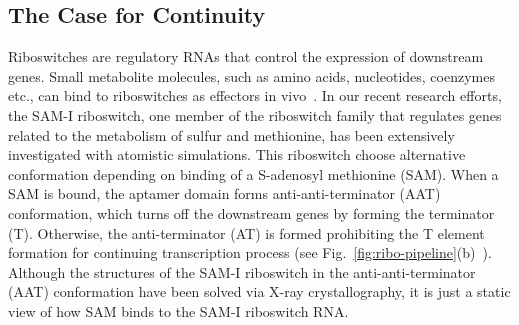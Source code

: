 \documentclass[a4paper,11pt]{article}
\newcommand{\yyenote}[1]{ {\textcolor{green} { ***YYE: #1 }}}
\newcommand{\yyenote}[1]{ {}}
\begin{document}


\subsection{The Case for Continuity}

Riboswitches are regulatory RNAs that control the expression of downstream genes. Small metabolite molecules, such as amino acids, nucleotides, coenzymes etc., can bind to riboswitches as effectors in vivo~\cite{mandal}.  In our recent research efforts, the SAM-I riboswitch, one member of the riboswitch family that regulates genes related to the metabolism of sulfur and methionine, has been extensively investigated with atomistic simulations.  This riboswitch choose alternative conformation depending on binding of a S-adenosyl methionine (SAM).  When a SAM is bound, the aptamer domain forms anti-anti-terminator (AAT) conformation, which turns off the downstream genes by forming the terminator (T). Otherwise, the anti-terminator (AT) is formed prohibiting the T element formation for continuing transcription process (see Fig.~\ref{fig:ribo-pipeline}(b)~\cite{brooke}).  Although the structures of the SAM-I riboswitch in the anti-anti-terminator (AAT) conformation have been solved via X-ray crystallography, it is just a static view of how SAM binds to the SAM-I riboswitch RNA.
\end{document}
